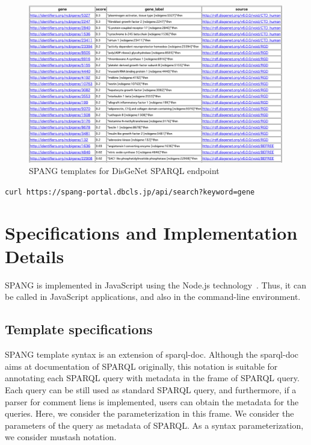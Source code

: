 \documentclass[runningheads]{llncs}
\begin{document}
\begin{figure}
\center
\includegraphics[width=1.0\textwidth]{spang_disease_gene_result.png}
\caption{SPANG templates for DisGeNet SPARQL endpoint}
\label{fig:spang_disease_gene_result}
\end{figure}




\texttt{curl https://spang-portal.dbcls.jp/api/search?keyword=gene}


\section{Specifications and Implementation Details}

SPANG is implemented in JavaScript using the Node.js technology~\cite{nodejs}. Thus, it can be called in JavaScript applications, and also in the command-line environment.

\subsection{Template specifications}
SPANG template syntax is an extension of sparql-doc. Although the sparql-doc aims at documentation of SPARQL originally, this notation is suitable for annotating each SPARQL query with metadata in the frame of SPARQL query. Each query can be still used as standard SPARQL query, and furthermore, if a parser for comment liens is implemented, users can obtain the metadata for the queries.
Here, we consider the parameterization in this frame. We consider the parameters of the query as metadata of SPARQL.
As a syntax parameterization, we consider mustash notation.
\end{document}
